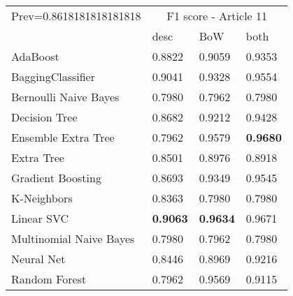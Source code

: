 \begin{tabular}{|l|l|l|l| }
\hline
Prev=0.8618181818181818 &  \multicolumn{3}{c|}{F1 score - Article 11} \\
\cline{2-4} & desc & BoW & both \\ \hline
AdaBoost                & 0.8822 & 0.9059 & 0.9353\\
BaggingClassifier       & 0.9041 & 0.9328 & 0.9554\\
Bernoulli Naive Bayes   & 0.7980 & 0.7962 & 0.7980\\
Decision Tree           & 0.8682 & 0.9212 & 0.9428\\
Ensemble Extra Tree     & 0.7962 & 0.9579 & {\bf 0.9680}\\
Extra Tree              & 0.8501 & 0.8976 & 0.8918\\
Gradient Boosting       & 0.8693 & 0.9349 & 0.9545\\
K-Neighbors             & 0.8363 & 0.7980 & 0.7980\\
Linear SVC              & {\bf 0.9063} & {\bf 0.9634} & 0.9671\\
Multinomial Naive Bayes & 0.7980 & 0.7962 & 0.7980\\
Neural Net              & 0.8446 & 0.8969 & 0.9216\\
Random Forest           & 0.7962 & 0.9569 & 0.9115\\
\hline
\end{tabular}